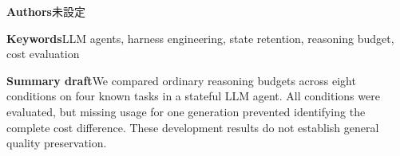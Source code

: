 \documentclass[uplatex,a4paper,twocolumn,10pt]{jsarticle}
\begin{document}
\noindent\textbf{Authors}\quad 未設定

\noindent\textbf{Keywords}\quad LLM agents, harness engineering, state retention, reasoning budget, cost evaluation

\noindent\textbf{Summary draft}\quad We compared ordinary reasoning budgets across eight conditions on four known tasks in a stateful LLM agent. All conditions were evaluated, but missing usage for one generation prevented identifying the complete cost difference. These development results do not establish general quality preservation.
\end{document}
